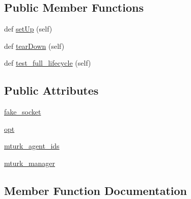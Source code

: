 \subsection*{Public Member Functions}
\begin{DoxyCompactItemize}
\item 
def \hyperlink{classparlai_1_1mturk_1_1core_1_1test_1_1test__mturk__manager_1_1TestMTurkManagerLifecycleFunctions_ad110fce7c0b667907acf9482edea7b3b}{set\+Up} (self)
\item 
def \hyperlink{classparlai_1_1mturk_1_1core_1_1test_1_1test__mturk__manager_1_1TestMTurkManagerLifecycleFunctions_a597cbfdc5382c94258e1be44af00818a}{tear\+Down} (self)
\item 
def \hyperlink{classparlai_1_1mturk_1_1core_1_1test_1_1test__mturk__manager_1_1TestMTurkManagerLifecycleFunctions_ae2a7198f22d5533f4947426457b9fc75}{test\+\_\+full\+\_\+lifecycle} (self)
\end{DoxyCompactItemize}
\subsection*{Public Attributes}
\begin{DoxyCompactItemize}
\item 
\hyperlink{classparlai_1_1mturk_1_1core_1_1test_1_1test__mturk__manager_1_1TestMTurkManagerLifecycleFunctions_a9ddbd7a32913dcb12f0934cafe636529}{fake\+\_\+socket}
\item 
\hyperlink{classparlai_1_1mturk_1_1core_1_1test_1_1test__mturk__manager_1_1TestMTurkManagerLifecycleFunctions_a235dd6261d7d4a9342bf418720167070}{opt}
\item 
\hyperlink{classparlai_1_1mturk_1_1core_1_1test_1_1test__mturk__manager_1_1TestMTurkManagerLifecycleFunctions_a3cdf6084f889a6e9cbd6f131be9995eb}{mturk\+\_\+agent\+\_\+ids}
\item 
\hyperlink{classparlai_1_1mturk_1_1core_1_1test_1_1test__mturk__manager_1_1TestMTurkManagerLifecycleFunctions_a6494c547e22e5e536a19c24ee33a33f1}{mturk\+\_\+manager}
\end{DoxyCompactItemize}


\subsection{Member Function Documentation}
\mbox{\label{classparlai_1_1mturk_1_1core_1_1test_1_1test__mturk__manager_1_1TestMTurkManagerLifecycleFunctions_ad110fce7c0b667907acf9482edea7b3b}} 
